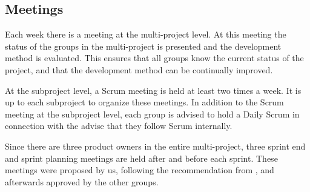 
\subsection{Meetings}\label{sec:meetings}
Each week there is a meeting at the multi-project level. At this meeting the status of the groups in the multi-project is presented and the development method is evaluated. This ensures that all groups know the current status of the project, and that the development method can be continually improved.

At the subproject level, a Scrum meeting is held at least two times a week. It is up to each subproject to organize these meetings. In addition to the Scrum meeting at the subproject level, each group is advised to hold a Daily Scrum in connection with the advise that they follow Scrum internally.

Since there are three product owners in the entire multi-project, three sprint end and sprint planning meetings are held after and before each sprint. These meetings were proposed by us, following the recommendation from \textcite{bird_davies_2007}, and afterwards approved by the other groups.

